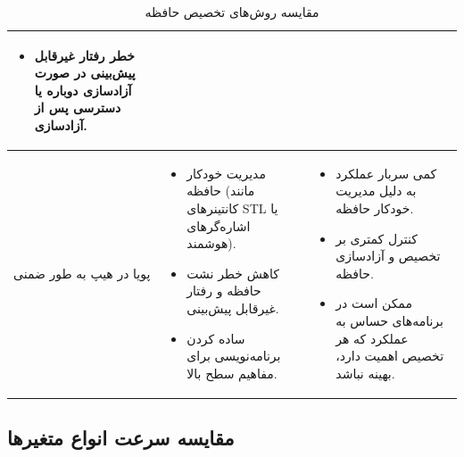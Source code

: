 \documentclass{article}
\begin{document}
\begin{table}[h!]
\begin{tabular}{|p{4cm}|p{6cm}|p{6cm}|}
\begin{itemize}
            \item خطر رفتار غیرقابل پیش‌بینی در صورت آزادسازی دوباره یا دسترسی پس از آزادسازی.
        \end{itemize} \\
        \hline
        پویا در هیپ به طور ضمنی &
        \begin{itemize}
            \item مدیریت خودکار حافظه (مانند کانتینرهای STL یا اشاره‌گرهای هوشمند).
            \item کاهش خطر نشت حافظه و رفتار غیرقابل پیش‌بینی.
            \item ساده کردن برنامه‌نویسی برای مفاهیم سطح بالا.
        \end{itemize} &
        \begin{itemize}
            \item کمی سربار عملکرد به دلیل مدیریت خودکار حافظه.
            \item کنترل کمتری بر تخصیص و آزادسازی حافظه.
            \item ممکن است در برنامه‌های حساس به عملکرد که هر تخصیص اهمیت دارد، بهینه نباشد.
        \end{itemize} \\
        \hline
    \end{tabular}
    \caption{مقایسه روش‌های تخصیص حافظه}
    \label{tab:memory_allocation}
\end{table}

\subsection*{مقایسه سرعت انواع متغیرها}
\end{document}
